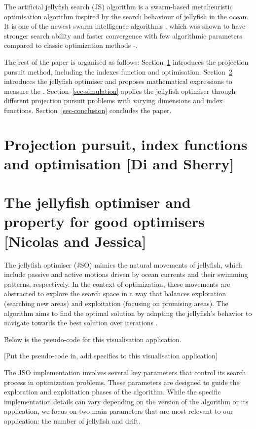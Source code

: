 \documentclass[
  number,
  preprint,
  3p]{elsarticle}
\begin{document}
The artificial jellyfish search (JS) algorithm \citep{chou_novel_2021}
is a swarm-based metaheuristic optimisation algorithm inspired by the
search behaviour of jellyfish in the ocean. It is one of the newest
swarm intelligence algorithms \citep{rajwar_exhaustive_2023}, which was
shown to have stronger search ability and faster convergence with few
algorithmic parameters compared to classic optimization methods
\citep{chou_novel_2021}-\citep{chou_recent_2022}.

The rest of the paper is organised as follows:
Section~\ref{sec-background} introduces the projection pursuit method,
including the indexes function and optimisation.
Section~\ref{sec-theory} introduces the jellyfish optimiser and proposes
mathematical expressions to measure the . Section~\ref{sec-simulation}
applies the jellyfish optimiser through different projection pursuit
problems with varying dimensions and index functions.
Section~\ref{sec-conclusion} concludes the paper.

\hypertarget{sec-background}{%
\section{Projection pursuit, index functions and optimisation {[}Di and
Sherry{]}}\label{sec-background}}

\hypertarget{sec-theory}{%
\section{The jellyfish optimiser and property for good optimisers
{[}Nicolas and Jessica{]}}\label{sec-theory}}

The jellyfish optimiser (JSO) mimics the natural movements of jellyfish,
which include passive and active motions driven by ocean currents and
their swimming patterns, respectively. In the context of optimization,
these movements are abstracted to explore the search space in a way that
balances exploration (searching new areas) and exploitation (focusing on
promising areas). The algorithm aims to find the optimal solution by
adapting the jellyfish's behavior to navigate towards the best solution
over iterations \citep{chou_novel_2021}.

Below is the pseudo-code for this visualisation application.

{[}Put the pseudo-code in, add specifics to this visualisation
application{]}

The JSO implementation involves several key parameters that control its
search process in optimization problems. These parameters are designed
to guide the exploration and exploitation phases of the algorithm. While
the specific implementation details can vary depending on the version of
the algorithm or its application, we focus on two main parameters that
are most relevant to our application: the number of jellyfish and drift.
\end{document}
